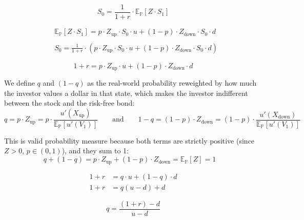 \documentclass[12pt, a4paper]{article}
\begin{document}
\vspace{1.5em}

\[
S_0 = \frac{1}{1+r} \cdot \mathbb{E}_{\mathbb{P}}\!\left[Z \cdot S_1\right]
\]

\begin{align*}
 & \mathbb{E}_{\mathbb{P}}\!\left[Z \cdot S_1\right] 
  = p \cdot Z_{\text{up}} \cdot S_0 \cdot u + (1-p) \cdot Z_{\text{down}} \cdot S_0 \cdot d \\[0.5pt]
\\[-8pt]
& S_0 = \frac{1}{1+r} \cdot \left( p \cdot Z_{\text{up}} \cdot S_0 \cdot u + (1-p) \cdot Z_{\text{down}} \cdot S_0 \cdot d \right)
\end{align*}
\vspace{1em}

\[
1 + r = p \cdot Z_{\text{up}} \cdot u + (1-p) \cdot Z_{\text{down}} \cdot d
\tag{IV}
\]

\noindent We define $q$ and $(1-q)$ as the real-world probability reweighted by how much the investor values a dollar in that state, which makes the investor indifferent between the stock and the risk-free bond:
\[
q = p \cdot Z_{\text{up}}
  = p \cdot \frac{u'(X_{\text{up}})}{\mathbb{E}_{\mathbb{P}}\!\left[u'(V_1)\right]}
\qquad \text{and} \qquad
1-q = (1-p) \cdot Z_{\text{down}}
       = (1-p) \cdot \frac{u'(X_{\text{down}})}{\mathbb{E}_{\mathbb{P}}\!\left[u'(V_1)\right]}
\]

\vspace{1em}

\noindent This is valid probability measure because both terms 
are strictly positive (since $Z > 0$, $p \in (0,1)$), and they sum to 1:
\[
q + (1-q) 
  = p \cdot Z_{\text{up}} + (1-p) \cdot Z_{\text{down}} 
  = \mathbb{E}_{\mathbb{P}}[Z] = 1 \quad 
\]
\vspace{0.1em}

\begin{align*}
1 + r &= q \cdot u + (1-q) \cdot d \\[4pt]
1 + r &= q(u - d) + d
\end{align*}

\[
\boxed{q = \frac{(1+r) - d}{u - d}}
\]
\vspace{1em}
\end{document}
